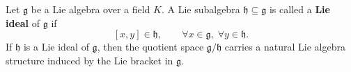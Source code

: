 Let $\mathfrak{g}$ be a Lie algebra over a field $K$. A Lie subalgebra $\mathfrak{h} \subseteq \mathfrak{g}$ is called a \textbf{Lie ideal} of $\mathfrak{g}$ if
$$
[x, y] \in \mathfrak{h}, \qquad \forall x \in \mathfrak{g}, \; \forall y \in \mathfrak{h}.
$$
If $\mathfrak{h}$ is a Lie ideal of $\mathfrak{g}$, then the quotient space $\mathfrak{g}/\mathfrak{h}$ carries a natural Lie algebra structure induced by the Lie bracket in $\mathfrak{g}$.
